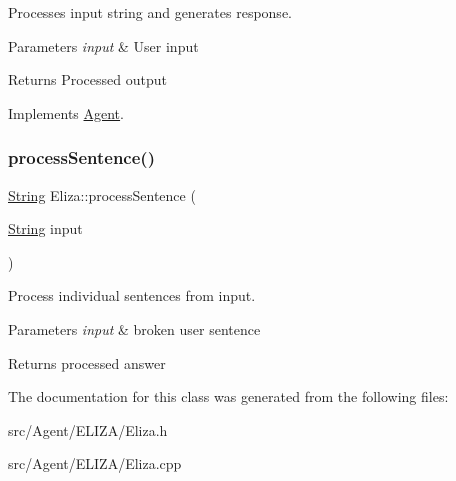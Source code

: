 Processes input string and generates response. 
\begin{DoxyParams}{Parameters}
{\em input} & User input \\
\hline
\end{DoxyParams}
\begin{DoxyReturn}{Returns}
Processed output 
\end{DoxyReturn}


Implements \mbox{\hyperlink{classAgent_a8908483f8d1302ec8dd65539369de9bb}{Agent}}.

\mbox{\label{classEliza_a388dad084acdf7310dc1028bdee044f2}} 
\subsubsection{\texorpdfstring{process\+Sentence()}{processSentence()}}
{\footnotesize\ttfamily \mbox{\hyperlink{classString}{String}} Eliza\+::process\+Sentence (\begin{DoxyParamCaption}\item[{\mbox{\hyperlink{classString}{String}}}]{input }\end{DoxyParamCaption})\hspace{0.3cm}{\ttfamily [private]}}

Process individual sentences from input. 
\begin{DoxyParams}{Parameters}
{\em input} & broken user sentence \\
\hline
\end{DoxyParams}
\begin{DoxyReturn}{Returns}
processed answer 
\end{DoxyReturn}


The documentation for this class was generated from the following files\+:\begin{DoxyCompactItemize}
\item 
src/\+Agent/\+E\+L\+I\+Z\+A/Eliza.\+h\item 
src/\+Agent/\+E\+L\+I\+Z\+A/Eliza.\+cpp\end{DoxyCompactItemize}
